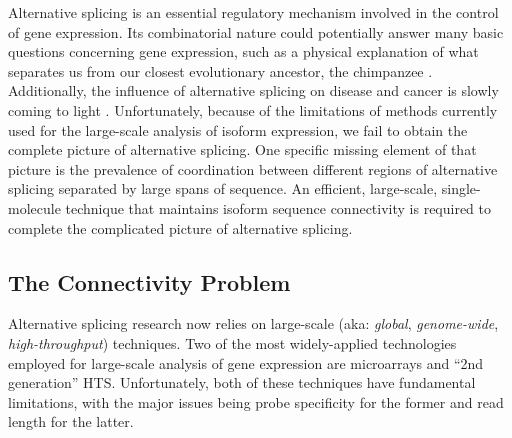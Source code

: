     Alternative splicing is an essential regulatory mechanism involved in the control of gene expression. Its combinatorial nature could potentially answer many basic questions concerning gene expression, such as a physical explanation of what separates us from our closest evolutionary ancestor, the chimpanzee \citep{Calarco2007a}. Additionally, the influence of alternative splicing on disease and cancer is slowly coming to light \citep{Tazi2009}. Unfortunately, because of the limitations of methods currently used for the large-scale analysis of isoform expression, we fail to obtain the complete picture of alternative splicing. One specific missing element of that picture is the prevalence of coordination between different regions of alternative splicing separated by large spans of sequence. An efficient, large-scale, single-molecule technique that maintains isoform sequence connectivity is required to complete the complicated picture of alternative splicing.

  \subsection{The Connectivity Problem}
    \label{Intro:sec:Isoform Problem}

    Alternative splicing research now relies on large-scale (aka: \textit{global}, \textit{genome-wide}, \textit{high-throughput}) techniques. Two of the most widely-applied technologies employed for large-scale analysis of gene expression are microarrays and ``2nd generation'' HTS. Unfortunately, both of these techniques have fundamental limitations, with the major issues being probe specificity for the former and read length for the latter.

